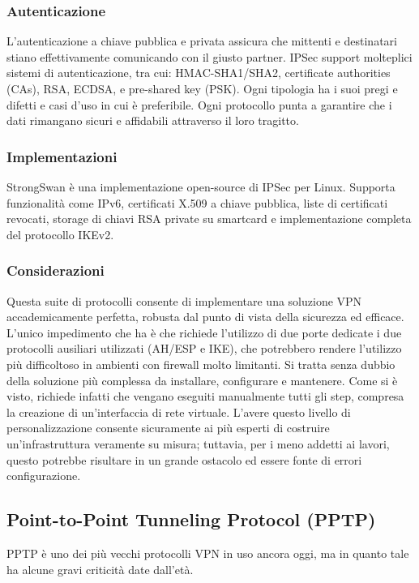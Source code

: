 \subsubsection{Autenticazione}
L'autenticazione a chiave pubblica e privata assicura che mittenti e destinatari stiano effettivamente comunicando con il giusto partner. IPSec support molteplici sistemi di autenticazione, tra cui: HMAC-SHA1/SHA2, certificate authorities (CAs), RSA, ECDSA, e pre-shared key (PSK). Ogni tipologia ha i suoi pregi e difetti e casi d'uso in cui è preferibile. Ogni protocollo punta a garantire che i dati rimangano sicuri e affidabili attraverso il loro tragitto.

\subsubsection{Implementazioni}
StrongSwan è una implementazione open-source di IPSec per Linux. Supporta funzionalità come IPv6, certificati X.509 a chiave pubblica, liste di certificati revocati, storage di chiavi RSA private su smartcard e implementazione completa del protocollo IKEv2.

\subsubsection{Considerazioni}
Questa suite di protocolli consente di implementare una soluzione VPN accademicamente perfetta, robusta dal punto di vista della sicurezza ed efficace. L'unico impedimento che ha è che richiede l'utilizzo di due porte dedicate i due protocolli ausiliari utilizzati (AH/ESP e IKE), che potrebbero rendere l'utilizzo più difficoltoso in ambienti con firewall molto limitanti.
Si tratta senza dubbio della soluzione più complessa da installare, configurare e mantenere. Come si è visto, richiede infatti che vengano eseguiti manualmente tutti gli step, compresa la creazione di un'interfaccia di rete virtuale.
L'avere questo livello di personalizzazione consente sicuramente ai più esperti di costruire un'infrastruttura veramente su misura; tuttavia, per i meno addetti ai lavori, questo potrebbe risultare in un grande ostacolo ed essere fonte di errori configurazione.

\subsection{Point-to-Point Tunneling Protocol (PPTP)}
PPTP è uno dei più vecchi protocolli VPN in uso ancora oggi, ma in quanto tale ha alcune gravi criticità date dall'età.

